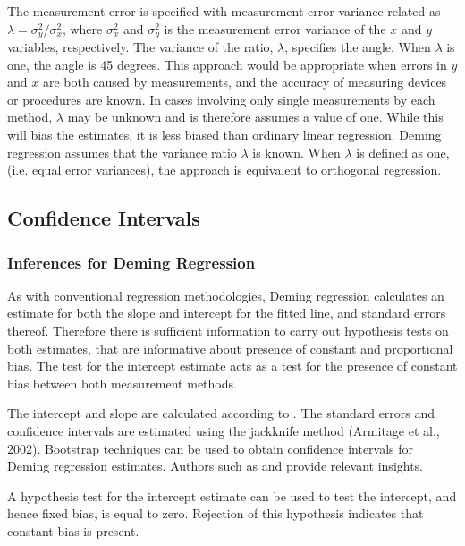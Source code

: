 \documentclass[12pt, a4paper]{report}
\theoremstyle{plain}
\theoremstyle{definition}
\theoremstyle{remark}
\begin{document}
The measurement error is specified with measurement error variance related as 
$\displaystyle{\lambda =\sigma^2_y/\sigma^2_x}$, where $\sigma^2_x$ and $\sigma^2_y$ is the measurement error variance of the $x$ and $y$ variables, respectively.
The variance of the ratio, $\lambda$, specifies the angle. When $\lambda$ is one, the angle is 45 degrees. 
This approach would be appropriate when errors in $y$ and $x$ are both caused by measurements, and the accuracy of measuring devices or procedures are known. In cases involving only single measurements by each method, $\lambda$ may be unknown and is therefore assumes a value of one. While this will bias the estimates, it is less biased than ordinary linear regression. Deming regression assumes that the variance ratio $\lambda$ is known. When $\lambda$ is defined as one, (i.e. equal error variances), the approach is equivalent to orthogonal regression.


\subsection{Confidence Intervals}


\subsubsection{Inferences for Deming Regression}
As with conventional regression methodologies, Deming regression calculates an estimate for both the slope and intercept for the fitted line, and standard errors thereof. Therefore there is sufficient information to carry out hypothesis tests on both estimates, that are informative about presence of constant and proportional bias. The test for the intercept estimate acts as a test for the presence of constant bias between both measurement methods.

The intercept and slope are calculated according to \citet{CornCoch}. The standard errors and confidence intervals are estimated using the jackknife method (Armitage et al., 2002). Bootstrap techniques can be used to obtain confidence intervals for Deming regression estimates. Authors such as 
\citet{carpenter2000bootstrap} and \citet{johnson2001bootstrap} provide relevant insights.

A hypothesis test for the intercept estimate can be used to test the intercept, and hence fixed bias, is equal to zero. Rejection of this hypothesis indicates that constant bias is present. 
\end{document}
